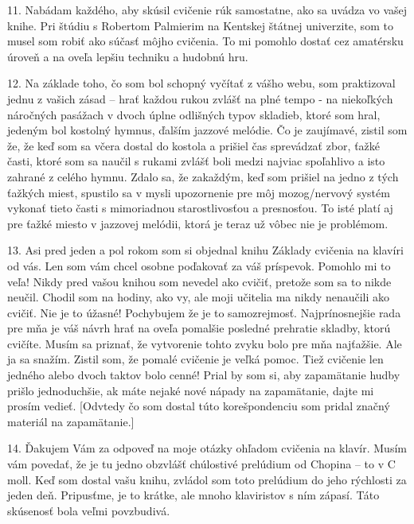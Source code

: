11. Nabádam každého, aby skúsil cvičenie rúk samostatne, ako sa uvádza vo vašej knihe. Pri štúdiu s Robertom Palmierim na Kentskej štátnej univerzite, som to musel som robiť ako súčasť môjho cvičenia. To mi pomohlo dostať cez amatérsku úroveň a na oveľa lepšiu techniku a hudobnú hru.
\medskip

12. Na základe toho, čo som bol schopný vyčítať z vášho webu, som praktizoval jednu z vašich zásad – hrať každou rukou zvlášť na plné tempo - na niekoľkých náročných pasážach v dvoch úplne odlišných typov skladieb, ktoré som hral, jedeným bol kostolný hymnus, ďalším jazzové melódie. Čo je zaujímavé, zistil som že, že keď som sa včera dostal do kostola a prišiel čas sprevádzať zbor, ťažké časti, ktoré som sa naučil s rukami zvlášť boli medzi najviac spoľahlivo a isto zahrané z celého hymnu. Zdalo sa, že zakaždým, keď som prišiel na jedno z tých ťažkých miest, spustilo sa v mysli upozornenie pre môj mozog/nervový systém vykonať tieto časti s mimoriadnou  starostlivosťou a presnosťou. To isté platí aj pre ťažké miesto v jazzovej melódii, ktorá je teraz už  vôbec nie je problémom.
\medskip

13. Asi pred jeden a pol rokom som si objednal knihu Základy cvičenia na klavíri od vás. Len som vám chcel osobne poďakovať za váš príspevok. Pomohlo mi to veľa! Nikdy pred vašou knihou som  nevedel ako cvičiť, pretože som sa to nikde neučil. Chodil som na hodiny, ako vy, ale moji učitelia ma nikdy nenaučili ako cvičiť. Nie je to úžasné! Pochybujem že je to samozrejmosť. Najprínosnejšie rada pre mňa je váš návrh hrať na oveľa pomalšie posledné prehratie skladby, ktorú cvičíte. Musím sa priznať, že vytvorenie tohto zvyku bolo pre mňa najťažšie. Ale ja sa snažím. Zistil som, že pomalé cvičenie je veľká pomoc. Tiež cvičenie len jedného alebo dvoch taktov bolo cenné! Prial by som si, aby zapamätanie hudby prišlo jednoduchšie, ak máte nejaké nové nápady na zapamätanie, dajte mi prosím vedieť. [Odvtedy čo som dostal túto korešpondenciu som pridal značný materiál na zapamätanie.]
\medskip

14. Ďakujem Vám za odpoveď na moje otázky ohľadom cvičenia na klavír. Musím vám povedať, že je tu jedno obzvlášť chúlostivé prelúdium od Chopina – to v C moll. Keď som dostal vašu knihu, zvládol som toto prelúdium do jeho rýchlosti za jeden deň. Pripusťme, je to krátke, ale mnoho klaviristov s ním zápasí. Táto skúsenosť bola veľmi povzbudivá.
\medskip

